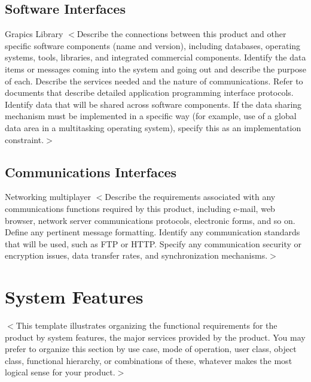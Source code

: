 \documentclass{scrreprt}
\begin{document}
\section{Software Interfaces}
Grapics Library
$<$Describe the connections between this product and other specific software 
components (name and version), including databases, operating systems, tools, 
libraries, and integrated commercial components. Identify the data items or 
messages coming into the system and going out and describe the purpose of each.  
Describe the services needed and the nature of communications. Refer to 
documents that describe detailed application programming interface protocols.  
Identify data that will be shared across software components. If the data 
sharing mechanism must be implemented in a specific way (for example, use of a 
global data area in a multitasking operating system), specify this as an 
implementation constraint.$>$

\section{Communications Interfaces}
Networking multiplayer
$<$Describe the requirements associated with any communications functions 
required by this product, including e-mail, web browser, network server 
communications protocols, electronic forms, and so on. Define any pertinent 
message formatting. Identify any communication standards that will be used, such 
as FTP or HTTP. Specify any communication security or encryption issues, data 
transfer rates, and synchronization mechanisms.$>$


\chapter{System Features}
$<$This template illustrates organizing the functional requirements for the 
product by system features, the major services provided by the product. You may 
prefer to organize this section by use case, mode of operation, user class, 
object class, functional hierarchy, or combinations of these, whatever makes the 
most logical sense for your product.$>$

\end{document}
